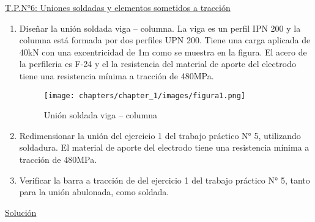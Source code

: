 \begin{center}
\underline{\Large{T.P.N°6: Uniones soldadas y elementos sometidos a tracción}}
\end{center}

\begin{enumerate}
\item Diseñar la unión soldada viga – columna. La viga es un perfil IPN 200 y la columna está
formada por dos perfiles UPN 200. Tiene una carga aplicada de 40kN con una excentricidad
de 1m como se muestra en la figura. El acero de la perfileria es F-24 y el la resistencia del
material de aporte del electrodo tiene una resistencia mínima a tracción de 480MPa.

\begin{figure}[H]
\begin{center}
     \texttt{[image: chapters/chapter\_1/images/figura1.png]}
\end{center}
\caption{Unión soldada viga – columna}
\end{figure}
\item Redimensionar la unión del ejercicio 1 del trabajo práctico N° 5, utilizando soldadura. El
material de aporte del electrodo tiene una resistencia mínima a tracción de 480MPa.

\item Verificar la barra a tracción de del ejercicio 1 del trabajo práctico N° 5, tanto para la unión
abulonada, como soldada.

\end{enumerate}

\newpage

\begin{center}
\underline{\Large{Solución}}
\end{center}


